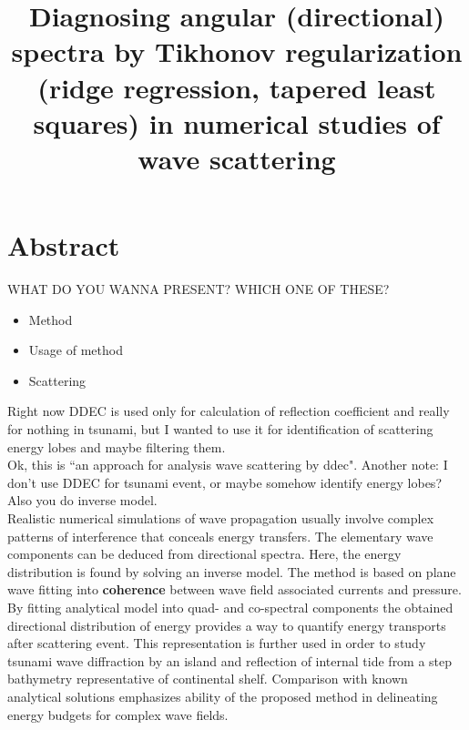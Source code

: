 



\title{Diagnosing angular (directional) spectra by Tikhonov regularization (ridge regression, tapered least squares) in numerical studies of wave scattering}
\maketitle

\section*{Abstract}
WHAT DO YOU WANNA PRESENT? WHICH ONE OF THESE?
\begin{itemize}
\item Method
\item Usage of method
\item Scattering
\end{itemize}
Right now DDEC is used only for calculation of reflection coefficient and really for nothing in tsunami, but I wanted to use it for identification of scattering energy lobes and maybe filtering them.\\
Ok, this is ``an approach for analysis wave scattering by ddec".
Another note: I don't use DDEC for tsunami event, or maybe somehow identify energy lobes? Also you do inverse model.\\

Realistic numerical simulations of wave propagation usually involve complex patterns of interference that conceals energy transfers. The elementary wave components can be deduced from directional spectra. Here, the energy distribution is found by solving an inverse model. The method is based on plane wave fitting into \textbf{coherence} between wave field associated currents and pressure. By fitting analytical model into quad- and co-spectral components the obtained directional distribution of energy provides a way to quantify energy transports after scattering event. This representation is further used in order to study tsunami wave diffraction by an island and reflection of internal tide from a step bathymetry representative of continental shelf. Comparison with known analytical solutions emphasizes ability of the proposed method in delineating energy budgets for complex wave fields.\\

